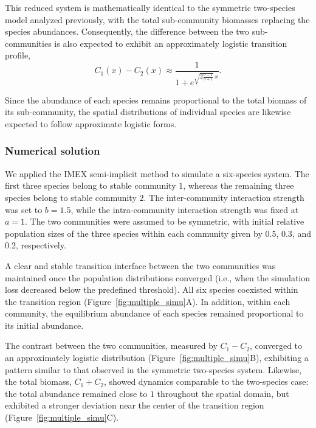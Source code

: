 This reduced system is mathematically identical to the symmetric two-species model analyzed previously, with the total sub-community biomasses replacing the species abundances. Consequently, the difference between the two sub-communities is also expected to exhibit an approximately logistic transition profile,
\begin{equation}
    C_1(x)-C_2(x)
    \approx
    \frac{1}{
        1+e^{\sqrt{2\frac{b-1}{b+1}}\,x}
    }.
\end{equation}

Since the abundance of each species remains proportional to the total biomass of its sub-community, the spatial distributions of individual species are likewise expected to follow approximate logistic forms.

\subsubsection{Numerical solution}

We applied the IMEX semi-implicit method to simulate a six-species system. The first three species belong to stable community $1$, whereas the remaining three species belong to stable community $2$. The inter-community interaction strength was set to $b = 1.5$, while the intra-community interaction strength was fixed at $a = 1$. The two communities were assumed to be symmetric, with initial relative population sizes of the three species within each community given by $0.5$, $0.3$, and $0.2$, respectively.

A clear and stable transition interface between the two communities was maintained once the population distributions converged (i.e., when the simulation loss decreased below the predefined threshold). All six species coexisted within the transition region (Figure~\ref{fig:multiple_simu}A). In addition, within each community, the equilibrium abundance of each species remained proportional to its initial abundance. 

The contrast between the two communities, measured by $C_1 - C_2$, converged to an approximately logistic distribution (Figure~\ref{fig:multiple_simu}B), exhibiting a pattern similar to that observed in the symmetric two-species system. Likewise, the total biomass, $C_1 + C_2$, showed dynamics comparable to the two-species case: the total abundance remained close to $1$ throughout the spatial domain, but exhibited a stronger deviation near the center of the transition region (Figure~\ref{fig:multiple_simu}C).

